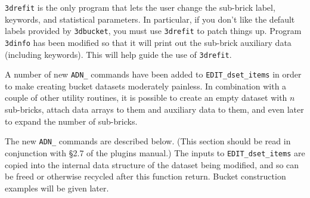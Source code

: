 \noindent
{\tt 3drefit} is the only program that lets the user change the
sub-brick label, keywords, and statistical parameters.  In particular,
if you don't like the default labels provided by {\tt 3dbucket},
you must use {\tt 3drefit} to patch things up.
Program {\tt 3dinfo} has been modified so that it will print
out the sub-brick auxiliary data (including keywords).  This will help guide
the use of {\tt 3drefit}.

A number of new {\tt ADN\_} commands have been added to
{\tt EDIT\_dset\_items} in order to make creating
bucket datasets moderately painless.  In combination
with a couple of other utility routines, it is possible
to create an empty dataset with $n$ sub-bricks, attach
data arrays to them and auxiliary data to them, and even
later to expand the number of sub-bricks.

The new {\tt ADN\_} commands are described below.
(This section should be read in conjunction with \S2.7
of the \afnit plugins manual.)
The inputs to {\tt EDIT\_dset\_items} are copied into the
internal data structure of the dataset being modified,
and so can be freed or otherwise recycled after
this function return.
Bucket construction examples will be given later.

